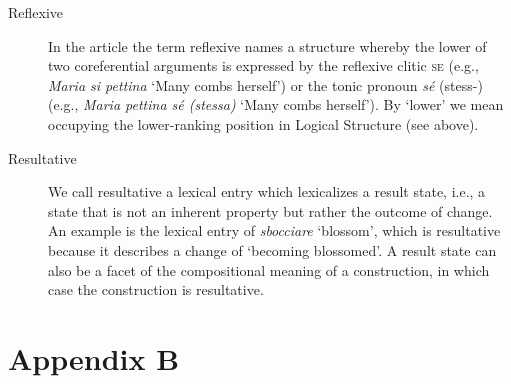 \documentclass[output=paper,colorlinks,citecolor=brown
]{langscibook}
\begin{document}
\begin{description}
\item[Reflexive] In the article the term reflexive   names a structure whereby the lower of two coreferential arguments is   expressed by the reflexive clitic \textsc{se} (e.g.,   \textit{Maria si pettina} ‘Many combs herself’) or the tonic pronoun \textit{sé}   (stess-) (e.g., \textit{Maria pettina sé (stessa)} ‘Many combs herself’).   By ‘lower’ we mean occupying the lower-ranking position in Logical Structure   (see above).
\item[Resultative] We call resultative a   lexical entry which lexicalizes a result state, i.e., a state that is not an   inherent property but rather the outcome of change. An example is the lexical   entry of \textit{sbocciare} ‘blossom’, which is resultative because it   describes a change of ‘becoming blossomed’. A result state can also be a facet   of the compositional meaning of a construction, in which case the   construction is resultative.
\end{description}



\section*{Appendix B}
\end{document}
